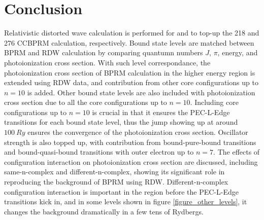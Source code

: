 \section{Conclusion}
Relativistic distorted wave calculation is performed for  and  to top-up the 218 and 276 CCBPRM calculation, respectively. Bound state levels are matched between BPRM and RDW calculation by comparing quantumn numbers $J$, $\pi$, energy, and photoionization cross section. With such level correspondance, the photoionization cross section of BPRM calculation in the higher energy region is extended using RDW data, and contribution from other core configurations up to $n=10$ is added. Other bound state levels are also included with photoionization cross section due to all the core configurations up to $n=10$. Including core configurations up to $n=10$ is crucial in that it ensures the PEC-L-Edge transitions for each bound state level, thus the jump showing up at around $100~Ry$ ensures the convergence of the photoionization cross section. Oscillator strength is also topped up, with contribution from bound-pure-bound transitions and bound-quasi-bound transitions with outer electron up to $n=7$. 
The effects of configuration interaction on photoionization cross section are discussed, including same-n-complex and different-n-complex, showing its significant role in reproducing the background of BPRM using RDW. Different-n-complex configuration interaction is important in the region before the PEC-L-Edge transitions kick in, and in some levels shown in figure \ref{figure_other_levels}, it changes the background dramatically in a few tens of Rydbergs. 